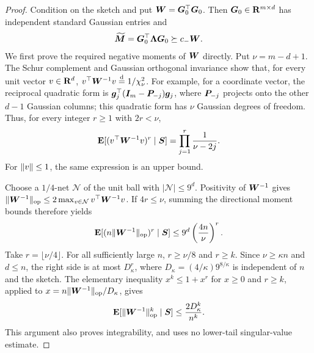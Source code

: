 \documentclass{article}
\theoremstyle{plain} %
\theoremstyle{definition} %
\theoremstyle{definition} %
\begin{document}
\begin{proof}
Condition on the sketch and put $\boldsymbol{W}=\boldsymbol{G}_0^\top\boldsymbol{G}_0$.
Then $\boldsymbol{G}_0\in{\mathbf{R}}^{m\times d}$ has independent standard Gaussian entries and
\begin{align}
    \widetilde{\boldsymbol{M}}=\boldsymbol{G}_0^\top\boldsymbol{\Lambda}\boldsymbol{G}_0
    \succeq c_-\boldsymbol{W}.
    \label{eq:M-inverse-PSD-lower}
\end{align}
We first prove the required negative moments of $\boldsymbol{W}$ directly.
Put $\nu=m-d+1$. The Schur complement and Gaussian orthogonal invariance
show that, for every unit vector $v\in{\mathbf{R}}^d$,
$v^\top\boldsymbol{W}^{-1}v\stackrel{\rm d}{=}1/\chi^2_\nu$.
For example, for a coordinate vector, the reciprocal quadratic form is
$\boldsymbol{g}_j^\top(\boldsymbol{I}_m-\boldsymbol{P}_{-j})\boldsymbol{g}_j$, where $\boldsymbol{P}_{-j}$ projects onto
the other $d-1$ Gaussian columns; this quadratic form has $\nu$ Gaussian degrees of freedom.
Thus, for every integer $r\geq1$ with $2r<\nu$,
\begin{align*}
    {\mathbf{E}}[(v^\top\boldsymbol{W}^{-1}v)^r\mid\boldsymbol{S}]
       =\prod_{j=1}^r\frac1{\nu-2j}.
\end{align*}
For $\lVert v\rVert\leq1$, the same expression is an upper bound.

Choose a $1/4$-net $\mathcal N$ of the unit ball with
$|\mathcal N|\leq9^d$. Positivity of $\boldsymbol{W}^{-1}$ gives
$\lVert\boldsymbol{W}^{-1}\rVert_{\rm op}\leq2\max_{v\in\mathcal N}v^\top\boldsymbol{W}^{-1}v$.
If $4r\leq\nu$, summing the directional moment bounds therefore yields
\begin{align*}
    {\mathbf{E}}[(n\lVert\boldsymbol{W}^{-1}\rVert_{\rm op})^r\mid\boldsymbol{S}]
       \leq9^d\left(\frac{4n}{\nu}\right)^r.
\end{align*}
Take $r=\lfloor\nu/4\rfloor$. For all sufficiently large $n$,
$r\geq\nu/8$ and $r\geq k$. Since $\nu\geq\kappa n$ and $d\leq n$,
the right side is at most $D_\kappa^r$, where
$D_\kappa=(4/\kappa)9^{8/\kappa}$ is independent of $n$ and the sketch.
The elementary inequality $x^k\leq1+x^r$ for $x\geq0$ and $r\geq k$,
applied to $x=n\lVert\boldsymbol{W}^{-1}\rVert_{\rm op}/D_\kappa$, gives
\begin{align}
    {\mathbf{E}}[\lVert\boldsymbol{W}^{-1}\rVert_{\rm op}^k\mid\boldsymbol{S}]
       \leq\frac{2D_\kappa^k}{n^k}.
    \label{eq:Wishart-inverse-op-moment}
\end{align}
This argument also proves integrability, and uses no lower-tail
singular-value estimate.


\end{proof}
\end{document}
